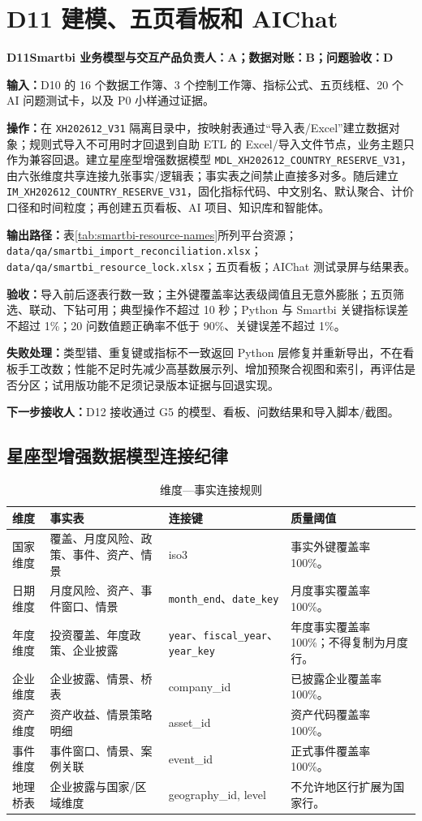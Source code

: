 \documentclass[UTF8,fontset=windows,12pt,openany]{ctexbook}
\newcommand{\Field}[1]{{\small\nolinkurl{#1}}}
\newcommand{\File}[1]{{\small\nolinkurl{#1}}}
\newcommand{\StepTitle}[3]{%
  \noindent\colorbox{DeepNavy}{\parbox{0.965\textwidth}{\color{white}\Large\bfseries #1\quad #2\hfill\normalsize #3}}\par\medskip
}
\newcommand{\CardRow}[2]{\noindent\textbf{#1：}#2\par}
\begin{document}
\section{D11 建模、五页看板和 AIChat}
\StepTitle{D11}{Smartbi 业务模型与交互产品}{负责人：A；数据对账：B；问题验收：D}
\CardRow{输入}{D10 的 16 个数据工作簿、3 个控制工作簿、指标公式、五页线框、20 个 AI 问题测试卡，以及 P0 小样通过证据。}
\CardRow{操作}{在 \Field{XH202612_V31} 隔离目录中，按映射表通过“导入表/Excel”建立数据对象；规则式导入不可用时才回退到自助 ETL 的 Excel/导入文件节点，业务主题只作为兼容回退。建立星座型增强数据模型 \Field{MDL_XH202612_COUNTRY_RESERVE_V31}，由六张维度共享连接九张事实/逻辑表；事实表之间禁止直接多对多。随后建立 \Field{IM_XH202612_COUNTRY_RESERVE_V31}，固化指标代码、中文别名、默认聚合、计价口径和时间粒度；再创建五页看板、AI 项目、知识库和智能体。}
\CardRow{输出路径}{表\ref{tab:smartbi-resource-names}所列平台资源；\File{data/qa/smartbi_import_reconciliation.xlsx}；\File{data/qa/smartbi_resource_lock.xlsx}；五页看板；AIChat 测试录屏与结果表。}
\CardRow{验收}{导入前后逐表行数一致；主外键覆盖率达表级阈值且无意外膨胀；五页筛选、联动、下钻可用；典型操作不超过 10 秒；Python 与 Smartbi 关键指标误差不超过 1\%；20 问数值题正确率不低于 90\%、关键误差不超过 1\%。}
\CardRow{失败处理}{类型错、重复键或指标不一致返回 Python 层修复并重新导出，不在看板手工改数；性能不足时先减少高基数展示列、增加预聚合视图和索引，再评估是否分区；试用版功能不足须记录版本证据与回退实现。}
\CardRow{下一步接收人}{D12 接收通过 G5 的模型、看板、问数结果和导入脚本/截图。}

\subsection{星座型增强数据模型连接纪律}

\begin{longtable}{p{3.8cm}p{3.2cm}p{3.3cm}p{3.1cm}}
\caption{维度—事实连接规则}\label{tab:model-joins}\\
\toprule
\textbf{维度} & \textbf{事实表} & \textbf{连接键} & \textbf{质量阈值}\\
\midrule
国家维度 & 覆盖、月度风险、政策、事件、资产、情景 & iso3 & 事实外键覆盖率 100\%。\\
日期维度 & 月度风险、资产、事件窗口、情景 & \Field{month_end}、\Field{date_key} & 月度事实覆盖率 100\%。\\
年度维度 & 投资覆盖、年度政策、企业披露 & \Field{year}、\Field{fiscal_year}、\Field{year_key} & 年度事实覆盖率 100\%；不得复制为月度行。\\
企业维度 & 企业披露、情景、桥表 & company\_id & 已披露企业覆盖率 100\%。\\
资产维度 & 资产收益、情景策略明细 & asset\_id & 资产代码覆盖率 100\%。\\
事件维度 & 事件窗口、情景、案例关联 & event\_id & 正式事件覆盖率 100\%。\\
地理桥表 & 企业披露与国家/区域维度 & geography\_id, level & 不允许地区行扩展为国家行。\\
\bottomrule
\end{longtable}
\end{document}
